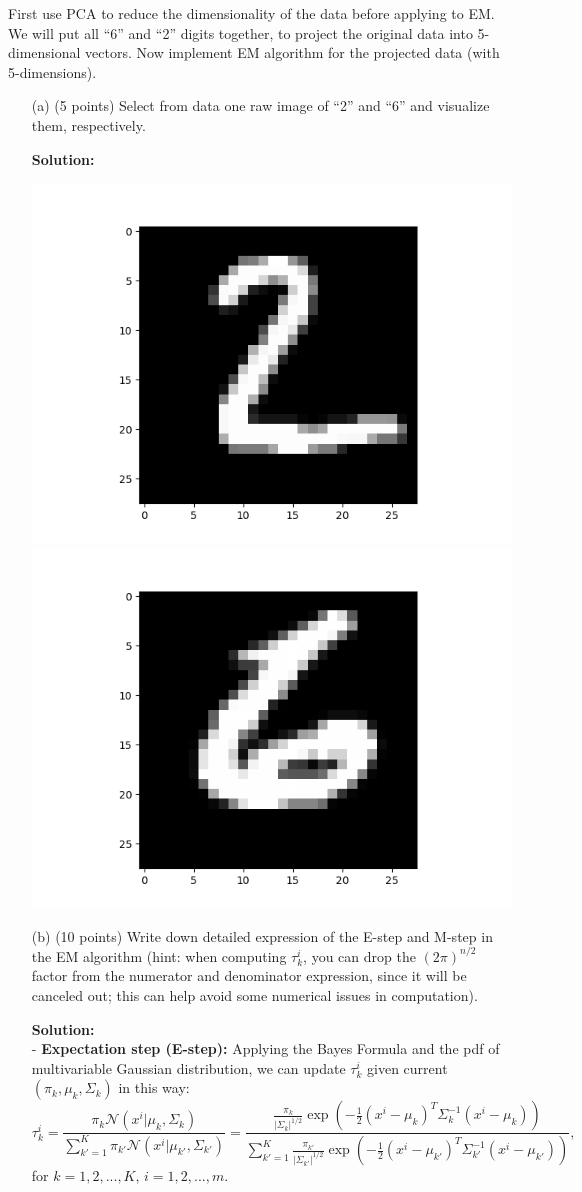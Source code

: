 \documentclass[twoside,12pt]{article}
\begin{document}
First use PCA to reduce the dimensionality of the data before applying to EM. We will put all ``6'' and ``2'' digits together, to project the original data into 5-dimensional vectors. Now implement EM algorithm for the projected data (with 5-dimensions). 
\begin{enumerate}

\item[(a)] (5 points) Select from data one raw image of ``2'' and ``6'' and visualize them, respectively. 
\begin{tcolorbox}
 \textbf{Solution:}\\
 \begin{center}
  \includegraphics[width=.48\textwidth]{Figure_2.png}
  \includegraphics[width=.48\textwidth]{Figure_6.png}
  \end{center}
 \end{tcolorbox}
 
\item[(b)] (10 points) Write down detailed expression of the E-step and M-step in the EM algorithm (hint: when computing $\tau_k^i$, you can drop the $(2\pi)^{n/2}$ factor from the numerator and denominator expression, since it will be canceled out; this can help avoid some numerical issues in computation).
\begin{tcolorbox}
 \textbf{Solution:}\\
 - \textbf{Expectation step (E-step):} Applying the Bayes Formula and the pdf of multivariable Gaussian distribution, we can update $\tau_k^i$ given current $(\pi_k, \mu_k, \Sigma_k)$ in this way:
 $$\tau_k^i  = \frac{\pi_k\mathcal{N}(x^i|\mu_k,\Sigma_k)}{\sum_{k'=1}^K\pi_{k'}\mathcal{N}(x^i|\mu_{k'},\Sigma_{k'})} = \frac{\frac{\pi_k}{|\Sigma_k|^{1/2}}  \exp (-\frac{1}{2} (x^i - \mu_k)^T\Sigma_k^{-1}(x^i-\mu_k))}{\sum_{k'=1}^K \frac{\pi_{k'}}{|\Sigma_{k'}|^{1/2}}\exp (-\frac{1}{2} (x^i - \mu_{k'})^T\Sigma_{k'}^{-1}(x^i-\mu_{k'}))}, $$
for $k = 1, 2, ..., K$, $i = 1, 2, ..., m$.\\


\end{tcolorbox}
\end{enumerate}
\end{document}

